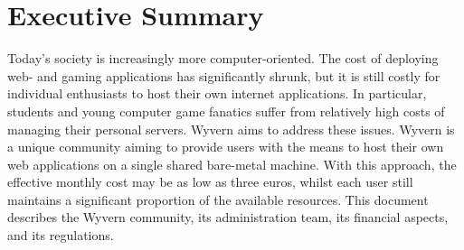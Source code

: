 \section{Executive Summary}
Today's society is increasingly more computer-oriented. The cost of deploying web- and gaming applications has significantly shrunk, but it is still costly for individual enthusiasts to host their own internet applications. In particular, students and young computer game fanatics suffer from relatively high costs of managing their personal servers. Wyvern aims to address these issues. Wyvern is a unique community aiming to provide users with the means to host their own web applications on a single shared bare-metal machine. With this approach, the effective monthly cost may be as low as three euros, whilst each user still maintains a significant proportion of the available resources. This document describes the Wyvern community, its administration team, its financial aspects, and its regulations.

